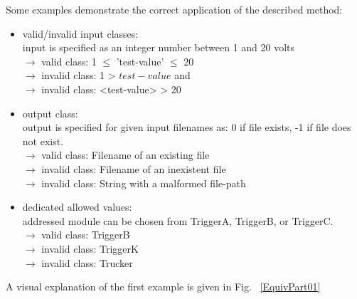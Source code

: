 	Some examples demonstrate the correct application of the described method:
	

	\begin{itemize}
		\item valid/invalid input classes: \\
			input is specified as an integer number between 1 and 20 volts \\
			$\rightarrow$ valid class: 1 $\le$ 'test-value' $\le$ 20 \\
			$\rightarrow$ invalid class: 1 > $test-value$ and \\
			$\rightarrow$ invalid class: <test-value> > 20 \\
		\item output class: \\
			output is specified for given input filenames as: 0 if file exists, -1 if file does not exist. \\
			$\rightarrow$ valid class: Filename of an existing file\\
			$\rightarrow$ invalid class:  Filename of an inexistent file\\
			$\rightarrow$ invalid class:  String with a malformed file-path \\
		\item dedicated allowed values: \\
			addressed module can be chosen from TriggerA, TriggerB, or TriggerC. \\
			$\rightarrow$ valid class: TriggerB \\
			$\rightarrow$ invalid class:  TriggerK \\
			$\rightarrow$ invalid class:  Trucker \\
	\end{itemize}

	A visual explanation of the first example is given in Fig. ~\ref{EquivPart01} 
	
